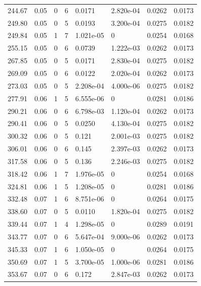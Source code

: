 \documentclass[preview]{standalone}
\begin{document}
{{{\begin{tabular}{L{1.2cm}C{1.2cm} C{0.3cm}C{0.5cm} C{1.4cm}C{1.4cm} C{1.4cm}C{1.4cm}}
  244.67  &  0.05  & 0     &  6 &  0.0171  & 2.820e-04  & 0.0262 &  0.0173   \\ 
  249.80  &  0.05  & 0     &  5 &  0.0193  & 3.200e-04  & 0.0275 &  0.0182   \\ 
  249.84  &  0.05  & 1     &  7 &  1.021e-05  & 0  & 0.0254 &  0.0168   \\ 
  255.15  &  0.05  & 0     &  6 &  0.0739  & 1.222e-03  & 0.0262 &  0.0173   \\ 
  267.85  &  0.05  & 0     &  5 &  0.0171  & 2.830e-04  & 0.0275 &  0.0182   \\ 
  269.09  &  0.05  & 0     &  6 &  0.0122  & 2.020e-04  & 0.0262 &  0.0173   \\ 
  273.03  &  0.05  & 0     &  5 &  2.208e-04  & 4.000e-06  & 0.0275 &  0.0182   \\ 
  277.91  &  0.06  & 1     &  5 &  6.555e-06  & 0  & 0.0281 &  0.0186   \\ 
  290.21  &  0.06  & 0     &  6 &  6.798e-03  & 1.120e-04  & 0.0262 &  0.0173   \\ 
  290.41  &  0.06  & 0     &  5 &  0.0250  & 4.130e-04  & 0.0275 &  0.0182   \\ 
  300.32  &  0.06  & 0     &  5 &  0.121  & 2.001e-03  & 0.0275 &  0.0182   \\ 
  306.01  &  0.06  & 0     &  6 &  0.145  & 2.397e-03  & 0.0262 &  0.0173   \\ 
  317.58  &  0.06  & 0     &  5 &  0.136  & 2.246e-03  & 0.0275 &  0.0182   \\ 
  318.42  &  0.06  & 1     &  7 &  1.976e-05  & 0  & 0.0254 &  0.0168   \\ 
  324.81  &  0.06  & 1     &  5 &  1.208e-05  & 0  & 0.0281 &  0.0186   \\ 
  332.48  &  0.07  & 1     &  6 &  8.751e-06  & 0  & 0.0264 &  0.0175   \\ 
  338.60  &  0.07  & 0     &  5 &  0.0110  & 1.820e-04  & 0.0275 &  0.0182   \\ 
  339.44  &  0.07  & 1     &  4 &  1.298e-05  & 0  & 0.0289 &  0.0191   \\ 
  343.77  &  0.07  & 0     &  6 &  5.647e-04  & 9.000e-06  & 0.0262 &  0.0173   \\ 
  345.33  &  0.07  & 1     &  6 &  1.050e-05  & 0  & 0.0264 &  0.0175   \\ 
  350.69  &  0.07  & 1     &  5 &  3.700e-05  & 1.000e-06  & 0.0281 &  0.0186   \\ 
  353.67  &  0.07  & 0     &  6 &  0.172  & 2.847e-03  & 0.0262 &  0.0173   \\ 

\end{tabular}}}}
\end{document}
